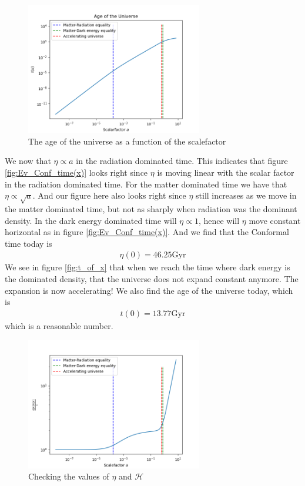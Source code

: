 \documentclass{aa}
\begin{document}
\begin{figure}[H]
	\centering
	\includegraphics[width=77mm]{t_of_x.png}
	\caption{The age of the universe as a function of the scalefactor}
	\label{fig:t_of_x}
\end{figure}
We now that $\eta \propto a$ in the radiation dominated time. This indicates that figure \eqref{fig:Ev_Conf_time(x)} looks right since $\eta$ is moving linear with the scalar factor in the radiation dominated time. For the matter dominated time we have that $\eta\propto \sqrt{a}$. And our figure here also looks right since $\eta$ still increases as we move in the matter dominated time, but not as sharply when radiation was the dominant density. In the dark energy dominated time will $\eta \propto 1$, hence will $\eta$ move constant horizontal as in figure \eqref{fig:Ev_Conf_time(x)}. And we find that the Conformal time today is 
\begin{align}
    \eta(0)=46.25\text{Gyr}
\end{align}
We see in figure \eqref{fig:t_of_x} that when we reach the time where  dark energy is the dominated density, that the universe does not expand constant anymore. The expansion is now accelerating! We also find the age of the universe today, which is
\begin{align}
    t(0)=13.77 \text{Gyr}
\end{align}
which is a reasonable number.
\begin{figure}[H]
	\centering
	\includegraphics[width=77mm]{eta_Hp_c.png}
	\caption{Checking the values of $\eta$ and $\mathcal{H}$}
	\label{eq:eta_Hp_c}
\end{figure}
\end{document}
